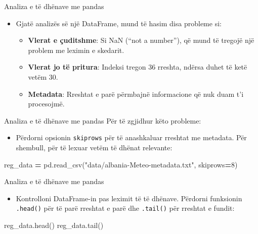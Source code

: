 \documentclass[
  ignorenonframetext,
]{beamer}
\newenvironment{Shaded}{\begin{snugshade}}{\end{snugshade}}
\newcommand{\DecValTok}[1]{\textcolor[rgb]{0.00,0.00,0.81}{#1}}
\newcommand{\NormalTok}[1]{#1}
\newcommand{\OperatorTok}[1]{\textcolor[rgb]{0.81,0.36,0.00}{\textbf{#1}}}
\newcommand{\StringTok}[1]{\textcolor[rgb]{0.31,0.60,0.02}{#1}}
\providecommand{\tightlist}{%
  \setlength{\itemsep}{0pt}\setlength{\parskip}{0pt}}
\begin{document}
\begin{frame}{Analiza e të dhënave me pandas}
\protect\hypertarget{analiza-e-tuxeb-dhuxebnave-me-pandas}{}
\begin{itemize}
\item
  Gjatë analizës së një DataFrame, mund të hasim disa probleme si:

  \begin{itemize}
  \item
    \textbf{Vlerat e çuditshme}: Si NaN (``not a number''), që mund të
    tregojë një problem me leximin e skedarit.
  \item
    \textbf{Vlerat jo të pritura}: Indeksi tregon 36 rreshta, ndërsa
    duhet të ketë vetëm 30.
  \item
    \textbf{Metadata}: Rreshtat e parë përmbajnë informacione që nuk
    duam t'i procesojmë.
  \end{itemize}
\end{itemize}
\end{frame}

\begin{frame}[fragile]{Analiza e të dhënave me pandas}
\protect\hypertarget{analiza-e-tuxeb-dhuxebnave-me-pandas-1}{}
Për të zgjidhur këto probleme:

\begin{itemize}
\tightlist
\item
  Përdorni opsionin \texttt{skiprows} për të anashkaluar rreshtat me
  metadata. Për shembull, për të lexuar vetëm të dhënat relevante:
\end{itemize}

\begin{Shaded}
\begin{Highlighting}[]
\NormalTok{reg\_data }\OperatorTok{=}\NormalTok{ pd.read\_csv(}\StringTok{"data/albania{-}Meteo{-}metadata.txt"}\NormalTok{, skiprows}\OperatorTok{=}\DecValTok{8}\NormalTok{)}
\end{Highlighting}
\end{Shaded}
\end{frame}

\begin{frame}[fragile]{Analiza e të dhënave me pandas}
\protect\hypertarget{analiza-e-tuxeb-dhuxebnave-me-pandas-2}{}
\begin{itemize}
\tightlist
\item
  Kontrolloni DataFrame-in pas leximit të të dhënave. Përdorni
  funksionin \texttt{.head()} për të parë rreshtat e parë dhe
  \texttt{.tail()} për rreshtat e fundit:
\end{itemize}

\begin{Shaded}
\begin{Highlighting}[]

\NormalTok{reg\_data.head()}
\NormalTok{reg\_data.tail()}
\end{Highlighting}
\end{Shaded}
\end{frame}
\end{document}
